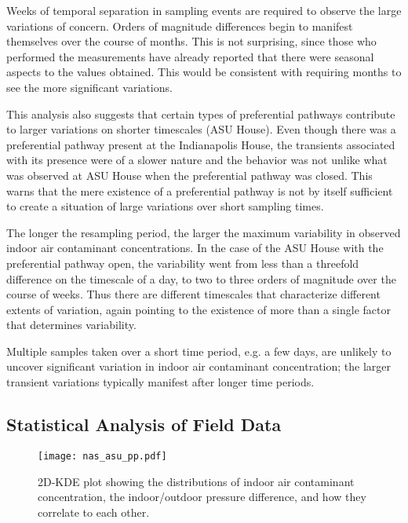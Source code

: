 \documentclass[journal=esthag,manuscript=article]{achemso}
\begin{document}
Weeks of temporal separation in sampling events are required to observe the large variations of concern.
Orders of magnitude differences begin to manifest themselves over the course of months.
This is not surprising, since those who performed the measurements have already reported that there were seasonal aspects to the values obtained.
This would be consistent with requiring months to see the more significant variations.\par

This analysis also suggests that certain types of preferential pathways contribute to larger variations on shorter timescales (ASU House).
Even though there was a preferential pathway present at the Indianapolis House, the transients associated with its presence were of a slower nature and the behavior was not unlike what was observed at ASU House when the preferential pathway was closed.
This warns that the mere existence of a preferential pathway is not by itself sufficient to create a situation of large variations over short sampling times.\par

The longer the resampling period, the larger the maximum variability in observed indoor air contaminant concentrations.
In the case of the ASU House with the preferential pathway open, the variability went from less than a threefold difference on the timescale of a day, to two to three orders of magnitude over the course of weeks.
Thus there are different timescales that characterize different extents of variation, again pointing to the existence of more than a single factor that determines variability.\par

Multiple samples taken over a short time period, e.g. a few days, are unlikely to uncover significant variation in indoor air contaminant concentration; the larger transient variations typically manifest after longer time periods. \par

\subsection{Statistical Analysis of Field Data}

\begin{figure}[htb!]
 \centering
 \caption{2D-KDE plot showing the distributions of indoor air contaminant concentration, the indoor/outdoor pressure difference, and how they correlate to each other.}
 \label{fig:kde}
 \texttt{[image: nas\_asu\_pp.pdf]}
\end{figure}
\end{document}
